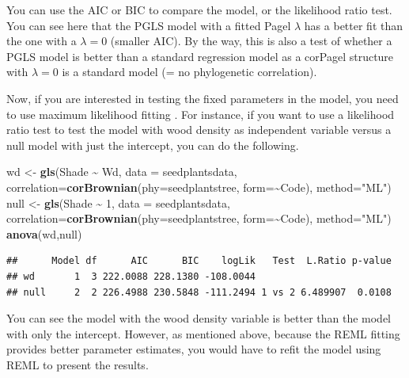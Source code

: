 \documentclass[
]{book}
\newenvironment{Shaded}{\begin{snugshade}}{\end{snugshade}}
\newcommand{\AttributeTok}[1]{\textcolor[rgb]{0.13,0.29,0.53}{#1}}
\newcommand{\DecValTok}[1]{\textcolor[rgb]{0.00,0.00,0.81}{#1}}
\newcommand{\FunctionTok}[1]{\textcolor[rgb]{0.13,0.29,0.53}{\textbf{#1}}}
\newcommand{\NormalTok}[1]{#1}
\newcommand{\OtherTok}[1]{\textcolor[rgb]{0.56,0.35,0.01}{#1}}
\newcommand{\SpecialCharTok}[1]{\textcolor[rgb]{0.81,0.36,0.00}{\textbf{#1}}}
\newcommand{\StringTok}[1]{\textcolor[rgb]{0.31,0.60,0.02}{#1}}
\begin{document}
You can use the AIC or BIC to compare the model, or the likelihood ratio test. You can see here that the PGLS model with a fitted Pagel \(\lambda\) has a better fit than the one with a \(\lambda=0\) (smaller AIC). By the way, this is also a test of whether a PGLS model is better than a standard regression model as a corPagel structure with \(\lambda=0\) is a standard model (= no phylogenetic correlation).

Now, if you are interested in testing the fixed parameters in the model, you need to use maximum likelihood fitting \citep{zuur2009mixed}. For instance, if you want to use a likelihood ratio test to test the model with wood density as independent variable versus a null model with just the intercept, you can do the following.

\begin{Shaded}
\begin{Highlighting}[]
\NormalTok{wd }\OtherTok{\textless{}{-}} \FunctionTok{gls}\NormalTok{(Shade }\SpecialCharTok{\textasciitilde{}}\NormalTok{ Wd, }\AttributeTok{data =}\NormalTok{ seedplantsdata,}
          \AttributeTok{correlation=}\FunctionTok{corBrownian}\NormalTok{(}\AttributeTok{phy=}\NormalTok{seedplantstree, }\AttributeTok{form=}\SpecialCharTok{\textasciitilde{}}\NormalTok{Code), }
          \AttributeTok{method=}\StringTok{"ML"}\NormalTok{)}
\NormalTok{null }\OtherTok{\textless{}{-}} \FunctionTok{gls}\NormalTok{(Shade }\SpecialCharTok{\textasciitilde{}} \DecValTok{1}\NormalTok{, }\AttributeTok{data =}\NormalTok{ seedplantsdata,}
            \AttributeTok{correlation=}\FunctionTok{corBrownian}\NormalTok{(}\AttributeTok{phy=}\NormalTok{seedplantstree, }\AttributeTok{form=}\SpecialCharTok{\textasciitilde{}}\NormalTok{Code), }
            \AttributeTok{method=}\StringTok{"ML"}\NormalTok{)}
\FunctionTok{anova}\NormalTok{(wd,null)}
\end{Highlighting}
\end{Shaded}

\begin{verbatim}
##      Model df      AIC      BIC    logLik   Test  L.Ratio p-value
## wd       1  3 222.0088 228.1380 -108.0044                        
## null     2  2 226.4988 230.5848 -111.2494 1 vs 2 6.489907  0.0108
\end{verbatim}

You can see the model with the wood density variable is better than the model with only the intercept. However, as mentioned above, because the REML fitting provides better parameter estimates, you would have to refit the model using REML to present the results.
\end{document}
